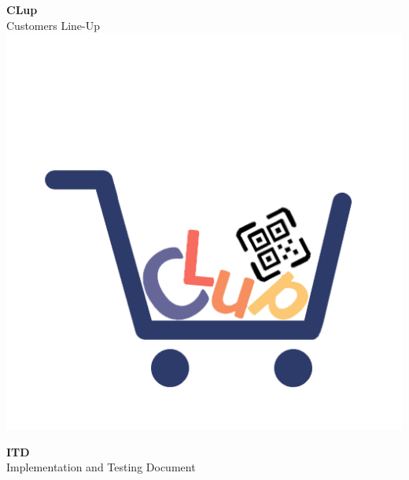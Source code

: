 



\begin{titlepage}
  \begin{center}

    \HUGE \textbf{CLup} \\[0.5cm]
    \LARGE Customers Line-Up \\[0.5cm]
    \hspace*{-1.2cm}\includegraphics[scale=0.5]{../../logo/clup_logo_nobg.png}

    \vfill

    \Huge \textbf{ITD} \\
    \LARGE Implementation and Testing Document \\[2cm]


\end{center}
\end{titlepage}
